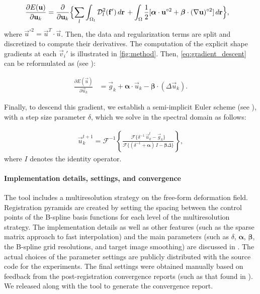   \begin{align}
  \frac{\partial E(\vec{u})}{\partial \vec{u}_k} &=
  \frac{ \partial }{\partial \vec{u}_k} \Big\{
  \underset{l}{\sum} \int_{\Omega_l} \mdist{f'}{l} \,d\vec{r} \, +   \int_{\Omega} \frac12 [ \boldsymbol{\alpha} \cdot \vec{u}^{\circ2}
  + \boldsymbol{\beta} \cdot (\nabla \vec{u})^{\circ2} ] \,d\vec{r}
  \Big\},
  \label{eq:gradient_descent}
  \end{align}
  where $\vec{u}^{\circ2} = \vec{u}^T \cdot \vec{u}$.
Then, the data and regularization terms are split and discretized to compute their
  derivatives.
The computation of the explicit shape gradients at each $\vec{v}_i'$ is illustrated in \autoref{fig:method}.
Then, \eqref{eq:gradient_descent} can be reformulated as (see ):

  \begin{align}
  \frac{\partial E(\vec{u})}{\partial \vec{u}_k} &=
  \vec{g}_k  + \boldsymbol{\alpha} \cdot \vec{u}_k - \boldsymbol{\beta} \cdot (\Delta \vec{u}_k).
  \label{eq:final_gradient}
  \end{align}

Finally, to descend this gradient, we establish a semi-implicit Euler scheme (see ),
  with a step size parameter $\delta$, which we solve in the spectral domain as follows:

  \begin{align}
  \vec{u}_k^{t+1} = \mathcal{F}^{-1}\left\{ \frac{\mathcal{F}\{\delta^{-1} \, \vec{u}_k^t - \vec{g}_k\} }                  {\mathcal{F}\{(\delta^{-1} + \boldsymbol{\alpha})\, I - \boldsymbol{\beta}\Delta\}} \right\},
  \label{eq:update_equation}
  \end{align}
  where $I$ denotes the identity operator.


\paragraph*{Implementation details, settings, and convergence}
\label{sec:conv_report}
The \regseg{} tool includes a multiresolution strategy on the free-form deformation field.
Registration pyramids are created by setting the spacing between the control points of the B-spline basis
  functions for each level of the multiresolution strategy.
The implementation details as well as other features (such as the sparse matrix approach
  to fast interpolation) and the main parameters
  (such as $\delta$, $\boldsymbol{\alpha}$, $\boldsymbol{\beta}$, the B-spline grid resolutions,
 and target image smoothing) are discussed in .
The actual choices of the parameter settings are publicly distributed with the source code for the experiments.
The final settings were obtained manually based on feedback from the post-registration convergence
  reports (such as that found in ).
We released \regseg{} along with the tool to generate the convergence report.

